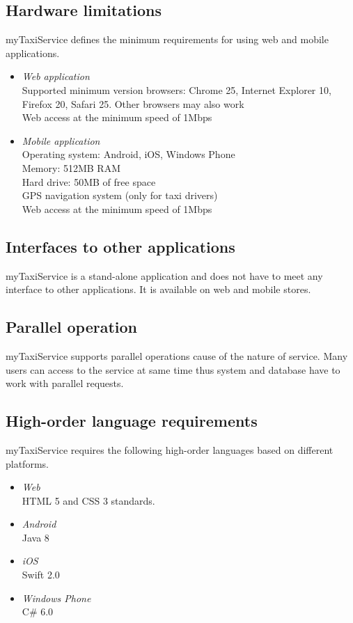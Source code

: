 \subsection{Hardware limitations}
myTaxiService defines the minimum requirements for using web and mobile applications.
\begin{itemize}
	\item \textit{Web application}\\
	Supported minimum version browsers: Chrome 25, Internet Explorer 10, Firefox 20, Safari 25. Other browsers may also work\\
	Web access at the minimum speed of 1Mbps
	\item \textit{Mobile application}\\
	Operating system: Android, iOS, Windows Phone\\
	Memory: 512MB RAM\\
	Hard drive: 50MB of free space\\
	GPS navigation system (only for taxi drivers)\\
	Web access at the minimum speed of 1Mbps
\end{itemize}

\subsection{Interfaces to other applications}
myTaxiService is a stand-alone application and does not have to meet any interface to other applications. It is available on web and mobile stores.

\subsection{Parallel operation}
myTaxiService supports parallel operations cause of the nature of service. Many users can access to the service at same time thus system and database have to work with parallel requests.


\subsection{High-order language requirements}
myTaxiService requires the following high-order languages based on different platforms.
\begin{itemize}
	\item\textit{Web}\\
	HTML 5 and CSS 3 standards.
	\item\textit{Android}\\
	Java 8
	\item\textit{iOS}\\
	Swift 2.0
	\item\textit{Windows Phone}\\
	C\# 6.0
\end{itemize}

